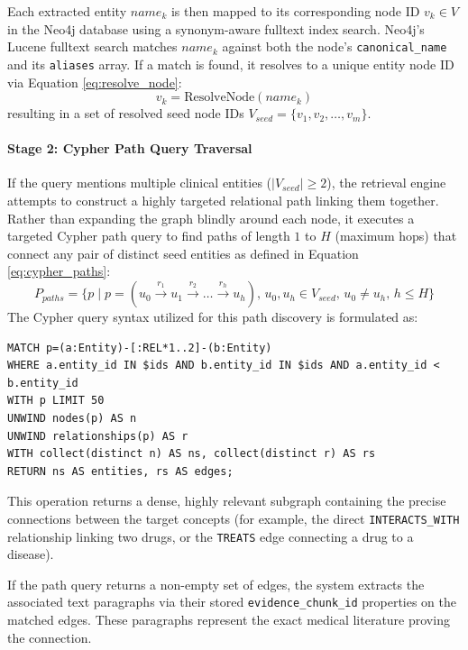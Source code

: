\documentclass[../main.tex]{subfiles}
\begin{document}
Each extracted entity $name_k$ is then mapped to its corresponding node ID $v_k \in V$ in the Neo4j database using a synonym-aware fulltext index search. Neo4j's Lucene fulltext search matches $name_k$ against both the node's \texttt{canonical\_name} and its \texttt{aliases} array. If a match is found, it resolves to a unique entity node ID via Equation \eqref{eq:resolve_node}:
\begin{equation}\label{eq:resolve_node}
v_k = \text{ResolveNode}(name_k)
\end{equation}
resulting in a set of resolved seed node IDs $V_{seed} = \{ v_1, v_2, \dots, v_m \}$.

\paragraph{Stage 2: Cypher Path Query Traversal}
If the query mentions multiple clinical entities ($|V_{seed}| \ge 2$), the retrieval engine attempts to construct a highly targeted relational path linking them together. Rather than expanding the graph blindly around each node, it executes a targeted Cypher path query to find paths of length $1$ to $H$ (maximum hops) that connect any pair of distinct seed entities as defined in Equation \eqref{eq:cypher_paths}:
\begin{equation}\label{eq:cypher_paths}
P_{paths} = \{ p \mid p = (u_0 \xrightarrow{r_1} u_1 \xrightarrow{r_2} \dots \xrightarrow{r_h} u_h), \, u_0, u_h \in V_{seed}, \, u_0 \neq u_h, \, h \le H \}
\end{equation}
The Cypher query syntax utilized for this path discovery is formulated as:
\begin{lstlisting}[basicstyle=\footnotesize\ttfamily,breaklines=true,columns=fullflexible]
MATCH p=(a:Entity)-[:REL*1..2]-(b:Entity)
WHERE a.entity_id IN $ids AND b.entity_id IN $ids AND a.entity_id < b.entity_id
WITH p LIMIT 50
UNWIND nodes(p) AS n
UNWIND relationships(p) AS r
WITH collect(distinct n) AS ns, collect(distinct r) AS rs
RETURN ns AS entities, rs AS edges;
\end{lstlisting}
This operation returns a dense, highly relevant subgraph containing the precise connections between the target concepts (for example, the direct \texttt{INTERACTS\_WITH} relationship linking two drugs, or the \texttt{TREATS} edge connecting a drug to a disease). 

If the path query returns a non-empty set of edges, the system extracts the associated text paragraphs via their stored \texttt{evidence\_chunk\_id} properties on the matched edges. These paragraphs represent the exact medical literature proving the connection.
\end{document}
